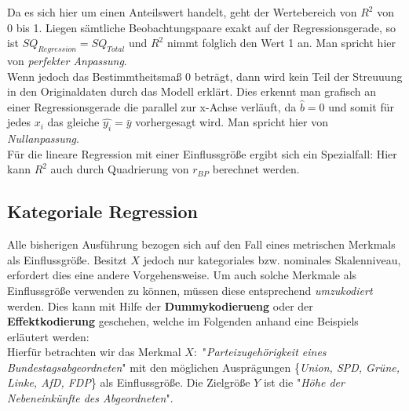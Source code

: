 \documentclass[a4paper]{article}
\newcommand\dangersign[1][2ex]{%
  \renewcommand\stacktype{L}%
  \scaleto{\stackon[1.3pt]{\color{red}$\triangle$}{\tiny !}}{#1}%
}
\begin{document}
\noindent Da es sich hier um einen Anteilswert handelt, geht der Wertebereich von $R^2$ von 0 bis 1.
Liegen sämtliche Beobachtungspaare exakt auf der Regressionsgerade, so ist $SQ_{Regression} = SQ_{Total}$ und $R^2$ nimmt folglich den Wert 1 an. Man spricht hier von \textit{perfekter Anpassung}.\\
Wenn jedoch das Bestimmtheitsmaß 0 beträgt, dann wird kein Teil der Streuuung in den Originaldaten durch das Modell erklärt. Dies erkennt man grafisch an einer Regressionsgerade die parallel zur x-Achse verläuft, da $\hat{b}=0$ und somit für jedes $x_i$ das gleiche $\hat{y_i} = \bar y$ vorhergesagt wird. Man spricht hier von \textit{Nullanpassung}.\\

\noindent \dangersign[3ex] Für die lineare Regression mit einer Einflussgröße ergibt sich ein Spezialfall: Hier kann $R^2$ auch durch Quadrierung von $r_{BP}$ berechnet werden.

\subsection{Kategoriale Regression} \label{sec:kat-reg}
Alle bisherigen Ausführung bezogen sich auf den Fall eines metrischen Merkmals als Einflussgröße. Besitzt $X$ jedoch nur kategoriales bzw. nominales Skalenniveau, erfordert dies eine andere Vorgehensweise. Um auch solche Merkmale als Einflussgröße verwenden zu können, müssen diese entsprechend \textit{umzukodiert} werden. Dies kann mit Hilfe der \textbf{Dummykodierueng} oder der \textbf{Effektkodierung} geschehen, welche im Folgenden anhand eine Beispiels erläutert werden:\\

\noindent Hierfür betrachten wir das Merkmal $X:$ "\textit{Parteizugehörigkeit eines Bundestagsabgeordneten}" mit den möglichen Ausprägungen \{\textit{Union, SPD, Grüne, Linke, AfD, FDP}\} als Einflussgröße. Die Zielgröße $Y$ ist die "\textit{Höhe der Nebeneinkünfte des Abgeordneten}".\\
\end{document}
